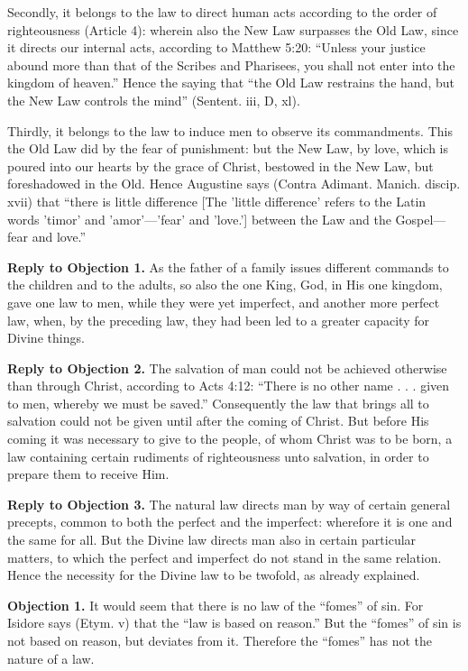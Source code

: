 Secondly, it belongs to the law to direct human acts according to the order of righteousness (Article 4): wherein also the New Law surpasses the Old Law, since it directs our internal acts, according to Matthew 5:20: ``Unless your justice abound more than that of the Scribes and Pharisees, you shall not enter into the kingdom of heaven.'' Hence the saying that ``the Old Law restrains the hand, but the New Law controls the mind'' (Sentent. iii, D, xl).

Thirdly, it belongs to the law to induce men to observe its commandments. This the Old Law did by the fear of punishment: but the New Law, by love, which is poured into our hearts by the grace of Christ, bestowed in the New Law, but foreshadowed in the Old. Hence Augustine says (Contra Adimant. Manich. discip. xvii) that ``there is little difference [The 'little difference' refers to the Latin words 'timor' and 'amor'—'fear' and 'love.'] between the Law and the Gospel—fear and love.''

\textbf{Reply to Objection 1.} As the father of a family issues different commands to the children and to the adults, so also the one King, God, in His one kingdom, gave one law to men, while they were yet imperfect, and another more perfect law, when, by the preceding law, they had been led to a greater capacity for Divine things.

\textbf{Reply to Objection 2.} The salvation of man could not be achieved otherwise than through Christ, according to Acts 4:12: ``There is no other name . . . given to men, whereby we must be saved.'' Consequently the law that brings all to salvation could not be given until after the coming of Christ. But before His coming it was necessary to give to the people, of whom Christ was to be born, a law containing certain rudiments of righteousness unto salvation, in order to prepare them to receive Him.

\textbf{Reply to Objection 3.} The natural law directs man by way of certain general precepts, common to both the perfect and the imperfect: wherefore it is one and the same for all. But the Divine law directs man also in certain particular matters, to which the perfect and imperfect do not stand in the same relation. Hence the necessity for the Divine law to be twofold, as already explained.


\textbf{Objection 1.} It would seem that there is no law of the ``fomes'' of sin. For Isidore says (Etym. v) that the ``law is based on reason.'' But the ``fomes'' of sin is not based on reason, but deviates from it. Therefore the ``fomes'' has not the nature of a law.

